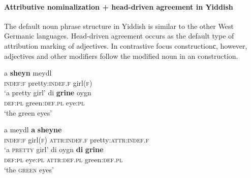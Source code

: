 \paragraph*{Attributive nominalization + head\hyp{}driven agreement in Yiddish}
\label{yiddish synchr}
The default noun phrase structure in Yiddish is similar to the other West Germanic languages. Head\hyp{}driven agreement occurs as the default type of attribution marking of adjectives. In contrastive focus constructionс, however, adjectives and other modifiers follow the modified noun in an  construction.
\begin{exe}
\begin{xlist}
\begin{xlist}
\ex 
\gll	a \textbf{sheyn} meydl\\
	\textsc{indef:f} pretty:\textsc{indef.f} girl\textsc{(f)}\\
\glt	‘a pretty girl’
\ex
\gll	di \textbf{grine} oygn\\
	\textsc{def:pl} green:\textsc{def.pl} eye:\textsc{pl}\\
\glt	‘the green eyes’
\end{xlist}
\begin{xlist}
\ex
\gll	a meydl \textbf{a} \textbf{sheyne}\\
	\textsc{indef:f} girl\textsc{(f)} \textsc{attr:indef.f} pretty:\textsc{attr:indef.f}\\
\glt	‘a \textsc{pretty} girl’
\ex
\gll	di oygn \textbf{di} \textbf{grine}\\
	\textsc{def:pl} eye:\textsc{pl} \textsc{attr:def.pl} green:\textsc{def.pl} \\
\glt	‘the \textsc{green} eyes’
\end{xlist}
\end{xlist}
\end{exe}

